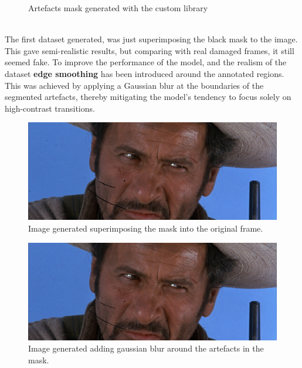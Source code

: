 \documentclass[openany, 12pt]{article}
\begin{document}
{\begin{figure}[h!]
		\caption{\smaller Artefacts mask generated with the custom library} 
	\end{figure}\\
	The first dataset generated, was just superimposing the black mask to the image. This gave semi-realistic results, but comparing with real damaged frames, it still seemed fake. To improve the performance of the model, and the realism of the dataset \textbf{edge smoothing} has been introduced around the annotated regions. This was achieved by applying a Gaussian blur at the boundaries of the segmented artefacts, thereby mitigating the model's tendency to focus solely on high-contrast transitions.\\
	\begin{figure}[h!]
		\centering
		\includegraphics[width=0.7\linewidth]{images/image_binary.png}
		\caption{\smaller Image generated superimposing the mask into the original frame.} 
	\end{figure}
	\begin{figure}[h!]
		\centering
		\includegraphics[width=0.7\linewidth]{images/image_blur.png}
		\caption{\smaller Image generated adding gaussian blur around the artefacts in the mask.} 
	\end{figure}\\
}
\end{document}

